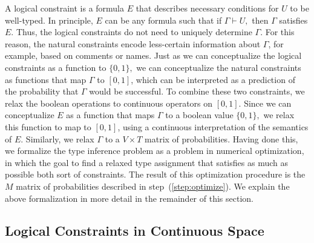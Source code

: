 \documentclass[sigplan,10pt,review,anonymous]{acmart}
\theoremstyle{plain}
\theoremstyle{remark}
\theoremstyle{definition}
\begin{document}
A logical constraint is a formula $E$ that describes
necessary conditions for $U$ to be well-typed. In principle,
$E$ can be any formula such that if $\Gamma \vdash U,$
then $\Gamma$ satisfies $E.$
Thus, the logical constraints 
do not need to uniquely determine $\Gamma$.
For this reason, the natural constraints
encode less-certain information about $\Gamma$,
for example, based on comments or names.
Just as we can conceptualize the logical
constraints as a function to $\{0, 1\},$
we can conceptualize the natural constraints as functions
that map $\Gamma$ to $[0, 1]$, which can be interpreted
as a prediction of the probability that $\Gamma$ would
be successful. To combine these two constraints, we relax the boolean operations to continuous operators on $[0, 1]$.
Since we can conceptualize $E$ as a function
that maps $\Gamma$ to a boolean value $\{0, 1\},$
we relax this function to map to $[0,1]$, using
a continuous interpretation of the semantics of $E.$
Similarly, we relax $\Gamma$ to a $V \times T$ matrix of probabilities. 
Having done this, we
formalize the type inference problem as a problem in 
numerical optimization, in which the goal to find a relaxed type
assignment
that satisfies as much as possible both sort of constraints.
The result of this optimization procedure is the 
$M$ matrix of probabilities described in step~(\ref{step:optimize}).
We explain the above formalization
in more detail in the remainder of this section.

\subsection{Logical Constraints in Continuous Space}\label{ssec:logcon}
\end{document}
